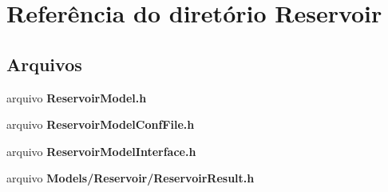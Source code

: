 \section{Referência do diretório Reservoir}
\label{dir_6a8f4de7eed35b6944a0ec4c0e4afb3c}
\subsection*{Arquivos}
\begin{DoxyCompactItemize}
\item 
arquivo {\bf Reservoir\+Model.\+h}
\item 
arquivo {\bf Reservoir\+Model\+Conf\+File.\+h}
\item 
arquivo {\bf Reservoir\+Model\+Interface.\+h}
\item 
arquivo {\bf Models/\+Reservoir/\+Reservoir\+Result.\+h}
\end{DoxyCompactItemize}

